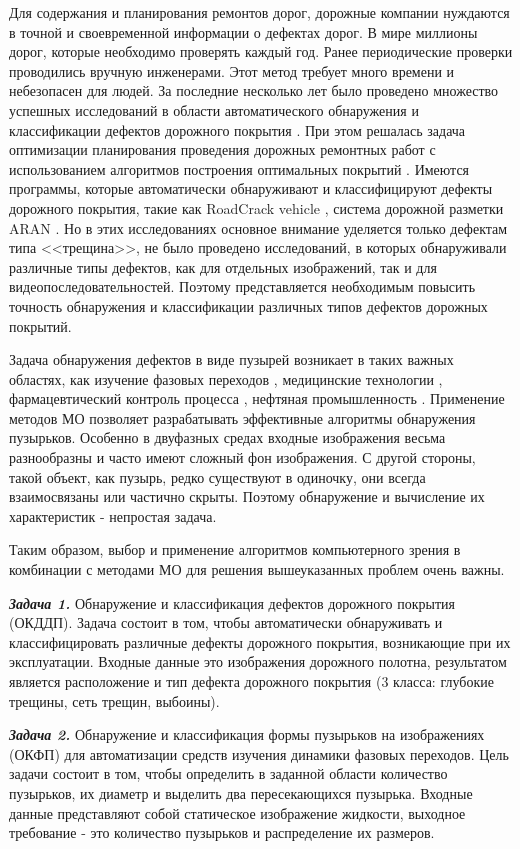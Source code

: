 Для содержания и планирования ремонтов дорог, дорожные компании нуждаются в точной и своевременной информации о дефектах дорог. В мире миллионы дорог, которые необходимо проверять каждый год. Ранее периодические проверки проводились вручную инженерами. Этот метод требует много времени и небезопасен для людей. За последние несколько лет было проведено множество успешных исследований в области автоматического обнаружения и классификации дефектов дорожного покрытия \cite{h13, h14, h15, h16, h17}. При этом решалась задача оптимизации планирования проведения дорожных ремонтных работ с использованием алгоритмов построения оптимальных покрытий \cite{h150, h151, h152}. Имеются программы, которые автоматически обнаруживают и классифицируют дефекты дорожного покрытия, такие как RoadCrack vehicle \cite{h18}, система дорожной разметки ARAN \cite{h19}. Но в этих исследованиях основное внимание уделяется только дефектам типа <<трещина>>, не было проведено исследований, в которых обнаруживали различные типы дефектов, как для отдельных изображений, так и для видеопоследовательностей. Поэтому представляется необходимым повысить точность обнаружения и классификации различных типов дефектов дорожных покрытий. 

Задача обнаружения дефектов в виде пузырей возникает в таких важных областях, как изучение фазовых переходов \cite{4wl}, медицинские технологии \cite{h17bb}, фармацевтический контроль процесса \cite{h18bb}, нефтяная промышленность \cite{h19bb}. Применение методов МО позволяет разрабатывать эффективные алгоритмы обнаружения пузырьков. Особенно в двуфазных средах входные изображения весьма разнообразны и часто имеют сложный фон изображения. С другой стороны, такой объект, как пузырь, редко существуют в одиночку, они всегда взаимосвязаны или частично скрыты. Поэтому обнаружение и вычисление их характеристик - непростая задача.

Таким образом, выбор и применение алгоритмов компьютерного зрения в комбинации с методами МО для решения вышеуказанных проблем очень важны.

\textbf{\textit{Задача 1.}} Обнаружение и классификация дефектов дорожного покрытия (ОКДДП). Задача состоит в том, чтобы автоматически обнаруживать и классифицировать различные дефекты дорожного покрытия, возникающие при их эксплуатации. Входные данные это изображения дорожного полотна, результатом является расположение и тип дефекта дорожного покрытия (3 класса: глубокие трещины, сеть трещин, выбоины).

\textbf{\textit{Задача 2.}} Обнаружение и классификация формы пузырьков на изображениях (ОКФП) для автоматизации средств изучения динамики фазовых переходов. Цель задачи состоит в том, чтобы определить в заданной области количество пузырьков, их диаметр и выделить два пересекающихся пузырька. Входные данные представляют собой статическое изображение жидкости, выходное требование - это количество пузырьков и распределение их размеров.

